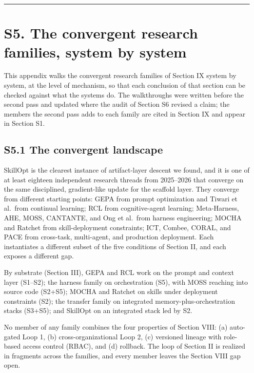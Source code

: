 \documentclass[
]{article}
\begin{document}
\begin{center}\rule{0.5\linewidth}{0.5pt}\end{center}

\section{S5. The convergent research families, system by
system}\label{s5.-the-convergent-research-families-system-by-system}

This appendix walks the convergent research families of Section IX
system by system, at the level of mechanism, so that each conclusion of
that section can be checked against what the systems do. The
walkthroughs were written before the second pass and updated where the
audit of Section S6 revised a claim; the members the second pass adds to
each family are cited in Section IX and appear in Section S1.

\subsection{S5.1 The convergent
landscape}\label{s5.1-the-convergent-landscape}

SkillOpt \cite{yang2026skillopt} is the clearest instance of
artifact-layer descent we found, and it is one of at least eighteen
independent research threads from 2025--2026 that converge on the same
disciplined, gradient-like update for the scaffold layer. They converge
from different starting points: GEPA from prompt optimization and Tiwari
et al.~from continual learning; RCL from cognitive-agent learning;
Meta-Harness, AHE, MOSS, CANTANTE, and Ong et al.~from harness
engineering; MOCHA and Ratchet from skill-deployment constraints; ICT,
Combee, CORAL, and PACE from cross-task, multi-agent, and production
deployment. Each instantiates a different subset of the five conditions
of Section II, and each exposes a different gap.

By substrate (Section III), GEPA and RCL work on the prompt and context
layer (S1--S2); the harness family on orchestration (S5), with MOSS
reaching into source code (S2+S5); MOCHA and Ratchet on skills under
deployment constraints (S2); the transfer family on integrated
memory-plus-orchestration stacks (S3+S5); and SkillOpt on an integrated
stack led by S2.

No member of any family combines the four properties of Section VIII:
(a) auto-gated Loop 1, (b) cross-organizational Loop 2, (c) versioned
lineage with role-based access control (RBAC), and (d) rollback. The
loop of Section II is realized in fragments across the families, and
every member leaves the Section VIII gap open.
\end{document}
